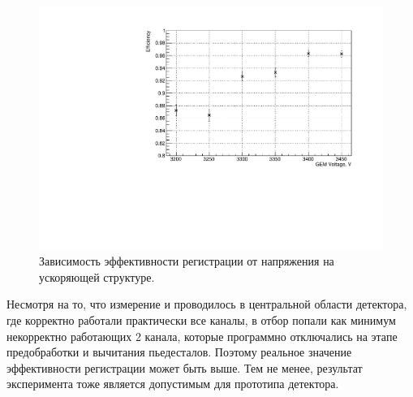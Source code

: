 \begin{figure}[h]
	\centering
	\includegraphics[width= 12cm]{img/eff_plot.pdf}
	\caption{Зависимость эффективности регистрации от напряжения на ускоряющей структуре.}
	\label{fig:eff_gr}
\end{figure}
Несмотря на то, что измерение и проводилось в центральной области детектора, где корректно работали практически все каналы, в отбор попали как минимум некорректно работающих 2 канала, которые программно отключались на этапе предобработки и вычитания пьедесталов. Поэтому реальное значение эффективности регистрации может быть выше. Тем не менее, результат эксперимента тоже является допустимым для прототипа детектора.  

